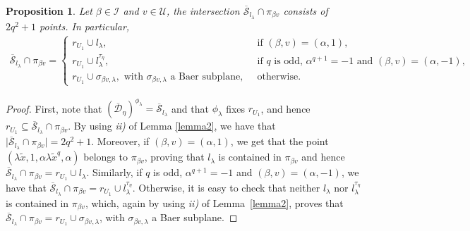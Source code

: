 \documentclass[11pt]{article}
\newtheorem{prop}[theorem]{Proposition}
\theoremstyle{definition}
\numberwithin{equation}{section}
\def\cI{\mathcal I}
\def\cU{\mathcal U}
\def\cS{\mathcal S}
\begin{document}
\begin{prop} \label{prop:interesctionSllambdapi}
Let $\beta \in \cI$ and $v \in \cU$, the intersection $\overline{\cS}_{l_\lambda}  \cap \pi_{\beta v}$ consists of $2q^2+1$ points. In particular, 
\begin{align*}
\overline{\cS}_{l_\lambda}  \cap \pi_{\beta v} =
\begin{cases}
r_{U_1} \cup l_\lambda, & \mbox{ if } (\beta, v) = (\alpha, 1), \\
r_{U_1} \cup l_\lambda^{\tau_{\eta}}, & \mbox{ if } q \mbox{ is odd, } \alpha^{q+1} = -1 \mbox{ and } (\beta, v) = (\alpha, -1), \\
r_{U_1} \cup \sigma_{\beta v, \lambda}, \mbox{ with } \sigma_{\beta v, \lambda} \mbox{ a Baer subplane, }  & \mbox{ otherwise. }%
\end{cases}
\end{align*}
\end{prop}
\begin{proof}
First, note that $\left(\overline{\mathcal{D}}_\eta\right)^{\phi_{\lambda}} = \overline{\cS}_{l_\lambda}$ and that $\phi_{\lambda}$ fixes $r_{U_1}$, and hence $r_{U_1} \subseteq \overline{\cS}_{l_\lambda} \cap \pi_{\beta v}$. By using {\em ii)} of Lemma \ref{lemma2}, we have that $\lvert \overline{\cS}_{l_\lambda} \cap \pi_{\beta v} \rvert = 2q^2 + 1$. Moreover,
if $(\beta, v) = (\alpha, 1)$, we get that the point $(\lambda \tilde{x}, 1, \alpha \lambda \tilde{x}^q, \alpha)$ belongs to $\pi_{\beta v}$, proving that $l_\lambda$ is contained in  $\pi_{\beta v}$ and hence $\overline{\cS}_{l_\lambda} \cap \pi_{\beta v} = r_{U_1} \cup l_\lambda$. Similarly, if $q$ is odd, $\alpha^{q+1} = -1$ and $(\beta, v) = (\alpha, -1)$, we have that $\overline{\cS}_{l_\lambda} \cap \pi_{\beta v} = r_{U_1} \cup l_\lambda^{\tau_\eta}$.  Otherwise, %
it is easy to check that neither $l_\lambda$ nor $l_\lambda^{\tau_{\eta}}$ is contained in $\pi_{\beta v}$, which, again by using {\em ii)} of Lemma~\ref{lemma2}, proves that
$\overline{\cS}_{l_\lambda} \cap \pi_{\beta v} = r_{U_1} \cup \sigma_{\beta v, \lambda}$,
with $\sigma_{\beta v, \lambda}$ a Baer subplane.
\end{proof}
\end{document}
